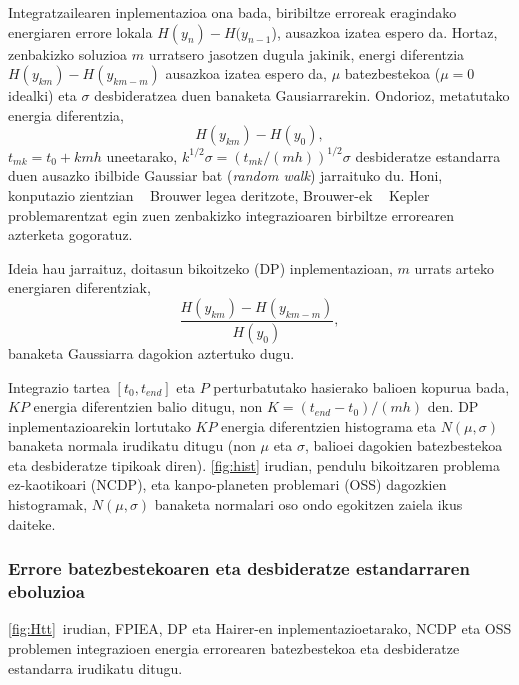 Integratzailearen inplementazioa ona bada, biribiltze erroreak eragindako energiaren errore lokala $H(y_n)-H(y_{n-1}$), ausazkoa izatea espero da. Hortaz, zenbakizko soluzioa $m$ urratsero jasotzen dugula jakinik, energi diferentzia $H(y_{km})-H(y_{km-m})$ ausazkoa izatea espero da, $\mu$ batezbestekoa ($\mu=0$ idealki) eta $\sigma$ desbideratzea duen banaketa Gausiarrarekin. Ondorioz, metatutako energia diferentzia,
\begin{equation*}
H(y_{km})-H(y_0),
\end{equation*} 
$t_{mk}=t_0+kmh$ uneetarako, $k^{1/2} \sigma=(t_{mk}/(mh))^{1/2} \sigma$ desbideratze estandarra duen ausazko ibilbide Gaussiar bat (\emph{random walk}) jarraituko du. Honi, konputazio zientzian ~\cite{Grazier2005} Brouwer legea deritzote, Brouwer-ek ~\cite{Brouwer1937} Kepler problemarentzat  egin zuen zenbakizko integrazioaren birbiltze errorearen azterketa gogoratuz.

Ideia hau jarraituz, doitasun bikoitzeko (DP) inplementazioan, $m$ urrats arteko energiaren diferentziak,
\begin{equation*}
\frac{H(y_{km})-H(y_{km-m})}{H(y_0)},
\end{equation*} 
banaketa Gaussiarra dagokion aztertuko dugu.   

Integrazio tartea $[t_0, t_{end}]$  eta $P$ perturbatutako hasierako balioen kopurua bada, $KP$ energia diferentzien balio ditugu,
non $K=(t_{end}-t_0)/(mh)$ den. DP inplementazioarekin lortutako $KP$ energia diferentzien histograma eta $N(\mu,\sigma)$ banaketa normala irudikatu ditugu (non $\mu$ eta $\sigma$, balioei dagokien batezbestekoa eta desbideratze tipikoak diren). \ref{fig:hist} irudian, pendulu bikoitzaren problema ez-kaotikoari (NCDP), eta kanpo-planeten problemari (OSS) dagozkien histogramak, $N(\mu,\sigma)$ banaketa normalari oso ondo egokitzen zaiela ikus daiteke.


\subsubsection*{Errore batezbestekoaren eta desbideratze estandarraren eboluzioa}


\ref{fig:Htt}~irudian, FPIEA, DP eta Hairer-en inplementazioetarako, NCDP eta OSS problemen integrazioen energia errorearen batezbestekoa eta desbideratze estandarra irudikatu ditugu.

